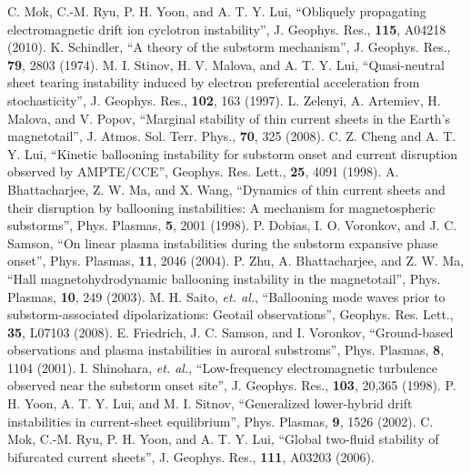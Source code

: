 \documentclass[twoside,11pt]{gshs_thesis}
\begin{document}
\clearpage
\begin{thebibliography}{99}\begin{onehalfspace}

C. Mok, C.-M. Ryu, P. H. Yoon, and A. T. Y. Lui, ``Obliquely propagating electromagnetic drift ion cyclotron instability'', J. Geophys. Res., {\bf 115}, A04218 (2010).
 K. Schindler, ``A theory of the substorm mechanism'', J. Geophys. Res., {\bf 79}, 2803 (1974).
 M. I. Stinov, H. V. Malova, and A. T. Y. Lui, ``Quasi-neutral sheet tearing instability induced by electron preferential acceleration from stochasticity'', J. Geophys. Res., {\bf 102}, 163 (1997).
 L. Zelenyi, A. Artemiev, H. Malova, and V. Popov, ``Marginal stability of thin current sheets in the Earth's magnetotail'', J. Atmos. Sol. Terr. Phys., {\bf 70}, 325 (2008).
 C. Z. Cheng and A. T. Y. Lui, ``Kinetic ballooning instability for substorm onset and current disruption observed by AMPTE/CCE'', Geophys. Res. Lett., {\bf 25}, 4091 (1998).
 A. Bhattacharjee, Z. W. Ma, and X. Wang, ``Dynamics of thin current sheets and their disruption by ballooning instabilities: A mechanism for magnetospheric substorms'', Phys. Plasmas, {\bf 5}, 2001 (1998).
 P. Dobias, I. O. Voronkov, and J. C. Samson, ``On linear plasma instabilities during the substorm expansive phase onset'', Phys. Plasmas, {\bf 11}, 2046 (2004).
 P. Zhu, A. Bhattacharjee, and Z. W. Ma, ``Hall magnetohydrodynamic ballooning instability in the magnetotail'', Phys. Plasmas, {\bf 10}, 249 (2003).
 M. H. Saito, {\it et. al.}, ``Ballooning mode waves prior to substorm-associated dipolarizations: Geotail observations'', Geophys. Res. Lett., {\bf 35}, L07103 (2008).
 E. Friedrich, J. C. Samson, and I. Voronkov, ``Ground-based observations and plasma instabilities in auroral substroms'', Phys. Plasmas, {\bf 8}, 1104 (2001).
 I. Shinohara, {\it et. al.}, ``Low-frequency electromagnetic turbulence observed near the substorm onset site'', J. Geophys. Res., {\bf 103}, 20,365 (1998).
 P. H. Yoon, A. T. Y. Lui, and M. I. Sitnov, ``Generalized lower-hybrid drift instabilities in current-sheet equilibrium'', Phys. Plasmas, {\bf 9}, 1526 (2002).
C. Mok, C.-M. Ryu, P. H. Yoon, and A. T. Y. Lui, ``Global two-fluid stability of bifurcated current sheets'', J. Geophys. Res., {\bf 111}, A03203 (2006).

\end{onehalfspace}
\end{thebibliography}
\end{document}
